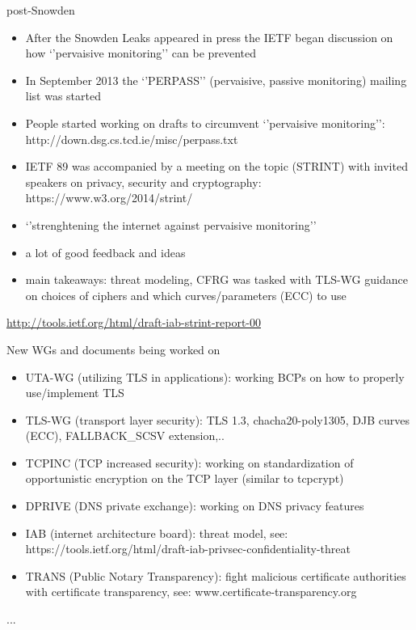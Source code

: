 
\begin{frame}{post-Snowden}
  \begin{itemize}
  \item After the Snowden Leaks appeared in press the IETF began discussion on how
`'pervaisive monitoring'' can be prevented
  \item In September 2013 the `'PERPASS'' (pervaisive, passive monitoring) mailing list was started
  \item People started working on drafts to circumvent `'pervaisive monitoring'': http://down.dsg.cs.tcd.ie/misc/perpass.txt
  \end{itemize}
\end{frame}

\begin{frame}
  \begin{itemize}
    \item IETF 89 was accompanied by a meeting on the topic (STRINT) with invited speakers on privacy, security and cryptography: https://www.w3.org/2014/strint/
    \item `'strenghtening the internet against pervaisive monitoring''
    \item a lot of good feedback and ideas
    \item main takeaways: threat modeling, CFRG was tasked with TLS-WG guidance on choices of ciphers and which curves/parameters (ECC) to use
  \end{itemize}
\tiny
\url{http://tools.ietf.org/html/draft-iab-strint-report-00}
\end{frame}


\begin{frame}{New WGs and documents being worked on }
  \begin{itemize}
    \item UTA-WG (utilizing TLS in applications): working BCPs on how to properly use/implement TLS
    \item TLS-WG (transport layer security): TLS 1.3, chacha20-poly1305, DJB curves (ECC), FALLBACK\_SCSV extension,..
    \item TCPINC (TCP increased security): working on standardization of opportunistic encryption on the TCP layer (similar to tcpcrypt)
    \item DPRIVE (DNS private exchange): working on DNS privacy features
    \item IAB (internet architecture board): threat model, see: https://tools.ietf.org/html/draft-iab-privsec-confidentiality-threat
    \item TRANS (Public Notary Transparency): fight malicious certificate authorities with certificate transparency, see: www.certificate-transparency.org
  \end{itemize}
...
\end{frame}

